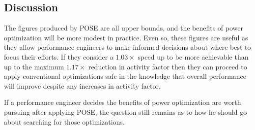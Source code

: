 \subsection{Discussion}
The figures produced by POSE are all upper bounds, and the benefits of power optimization will be more modest in practice. Even so, these figures are useful as they allow performance engineers to make informed decisions about where best to focus their efforts. If they consider a $1.03 \times$ speed up to be more achievable than up to the maximum $1.17\times$ reduction in activity factor then they can proceed to apply conventional optimizations safe in the knowledge that overall performance will improve despite any increases in activity factor.

If a performance engineer decides the benefits of power optimization are worth pursuing after applying POSE, the question still remains as to how he should go about searching for those optimizations.

